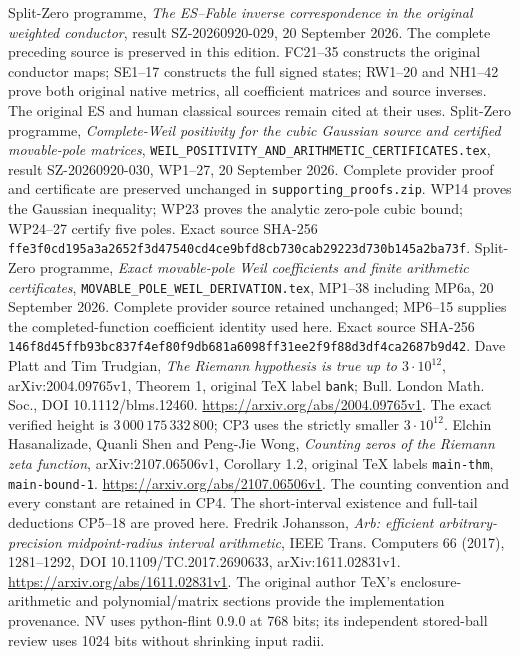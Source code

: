 
 Split-Zero programme,
\emph{The ES--Fable inverse correspondence in the original weighted conductor},
result SZ-20260920-029, 20 September 2026. The complete preceding source is
preserved in this edition. FC21--35 constructs the original conductor maps;
SE1--17 constructs the full signed states; RW1--20 and NH1--42 prove both
original native metrics, all coefficient matrices and source inverses.
The original ES and human classical sources remain cited at their uses.
 Split-Zero programme,
\emph{Complete-Weil positivity for the cubic Gaussian source and certified
movable-pole matrices},
\texttt{WEIL\_POSITIVITY\_AND\_ARITHMETIC\_CERTIFICATES.tex},
result SZ-20260920-030, WP1--27, 20 September 2026.
Complete provider proof and certificate are preserved unchanged in
\texttt{supporting\_proofs.zip}. WP14 proves the Gaussian inequality;
WP23 proves the analytic zero-pole cubic bound; WP24--27 certify five poles.
Exact source SHA-256
\texttt{ffe3f0cd195a3a2652f3d47540cd4ce9bfd8cb730cab29223d730b145a2ba73f}.
 Split-Zero programme,
\emph{Exact movable-pole Weil coefficients and finite arithmetic certificates},
\texttt{MOVABLE\_POLE\_WEIL\_DERIVATION.tex}, MP1--38 including MP6a,
20 September 2026. Complete provider source retained unchanged;
MP6--15 supplies the completed-function coefficient identity used here.
Exact source SHA-256
\texttt{146f8d45ffb93bc837f4ef80f9db681a6098ff31ee2f9f88d3df4ca2687b9d42}.
 Dave Platt and Tim Trudgian,
\emph{The Riemann hypothesis is true up to $3\cdot10^{12}$},
arXiv:2004.09765v1, Theorem 1, original TeX label \texttt{bank};
Bull. London Math. Soc., DOI 10.1112/blms.12460.
\url{https://arxiv.org/abs/2004.09765v1}.
The exact verified height is $3\,000\,175\,332\,800$;
CP3 uses the strictly smaller $3\cdot10^{12}$.
 Elchin Hasanalizade, Quanli Shen and Peng-Jie Wong,
\emph{Counting zeros of the Riemann zeta function},
arXiv:2107.06506v1, Corollary 1.2,
original TeX labels \texttt{main-thm}, \texttt{main-bound-1}.
\url{https://arxiv.org/abs/2107.06506v1}.
The counting convention and every constant are retained in CP4.
The short-interval existence and full-tail deductions CP5--18 are proved here.
 Fredrik Johansson,
\emph{Arb: efficient arbitrary-precision midpoint-radius interval arithmetic},
IEEE Trans. Computers 66 (2017), 1281--1292,
DOI 10.1109/TC.2017.2690633, arXiv:1611.02831v1.
\url{https://arxiv.org/abs/1611.02831v1}.
The original author TeX's enclosure-arithmetic and polynomial/matrix sections
provide the implementation provenance. NV uses python-flint 0.9.0 at 768 bits;
its independent stored-ball review uses 1024 bits without shrinking input radii.
